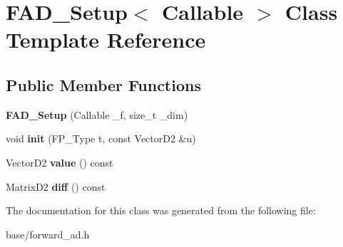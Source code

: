 \hypertarget{classFAD__Setup}{}\section{F\+A\+D\+\_\+\+Setup$<$ Callable $>$ Class Template Reference}
\label{classFAD__Setup}
\subsection*{Public Member Functions}
\begin{DoxyCompactItemize}
\item 
\mbox{\label{classFAD__Setup_a56e892cf0bf3e45b4e876358ead86eab}} 
{\bfseries F\+A\+D\+\_\+\+Setup} (Callable \+\_\+f, size\+\_\+t \+\_\+dim)
\item 
\mbox{\label{classFAD__Setup_ad74e04fc77c2c71cb148fb6c0669ec4c}} 
void {\bfseries init} (F\+P\+\_\+\+Type t, const Vector\+D2 \&u)
\item 
\mbox{\label{classFAD__Setup_acb22c26fbf5fa230ece2015c67c43739}} 
Vector\+D2 {\bfseries value} () const
\item 
\mbox{\label{classFAD__Setup_ac2a3397c412aa928a7c3227023e9bc04}} 
Matrix\+D2 {\bfseries diff} () const
\end{DoxyCompactItemize}


The documentation for this class was generated from the following file\+:\begin{DoxyCompactItemize}
\item 
base/forward\+\_\+ad.\+h\end{DoxyCompactItemize}
